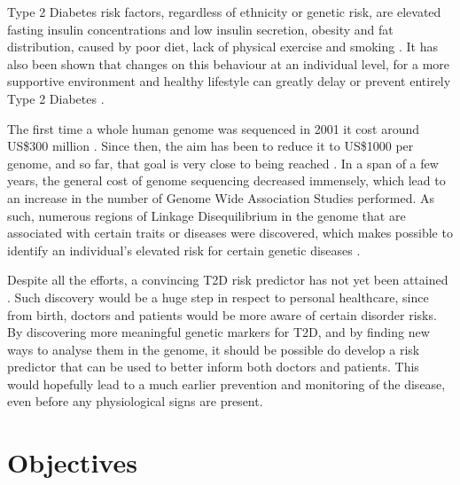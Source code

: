 Type 2 Diabetes risk factors, regardless of ethnicity or genetic risk, are elevated fasting insulin concentrations and low insulin secretion, obesity and fat distribution, caused by poor diet, lack of physical exercise and smoking \cite{chan1994obesity,haffner1998epidemiology}. It has also been shown that changes on this behaviour at an individual level, for a more supportive environment and healthy lifestyle can greatly delay or prevent entirely Type 2 Diabetes \cite{world2016global,ley2014prevention}.

The first time a whole human genome was sequenced in 2001 it cost around US\$300 million \cite{venter2001sequence}. Since then, the aim has been to reduce it to US\$1000 per genome, and so far, that goal is very close to being reached \cite{hayden20141}. In a span of a few years, the general cost of genome sequencing decreased immensely, which lead to an increase in the number of Genome Wide Association Studies performed. As such, numerous regions of Linkage Disequilibrium in the genome that are associated with certain traits or diseases were discovered, which makes possible to identify an individual's elevated risk for certain genetic diseases \cite{macarthur2016new}.

Despite all the efforts, a convincing T2D risk predictor has not yet been attained \cite{wang2016genetic}. Such discovery would be a huge step in respect to personal healthcare, since from birth, doctors and patients would be more aware of certain disorder risks. By discovering more meaningful genetic markers for T2D, and by finding new ways to analyse them in the genome, it should be possible do develop a risk predictor that can be used to better inform both doctors and patients. This would hopefully lead to a much earlier prevention and monitoring of the disease, even before any physiological signs are present. \cite{lall2017personalized}


\section{Objectives}

